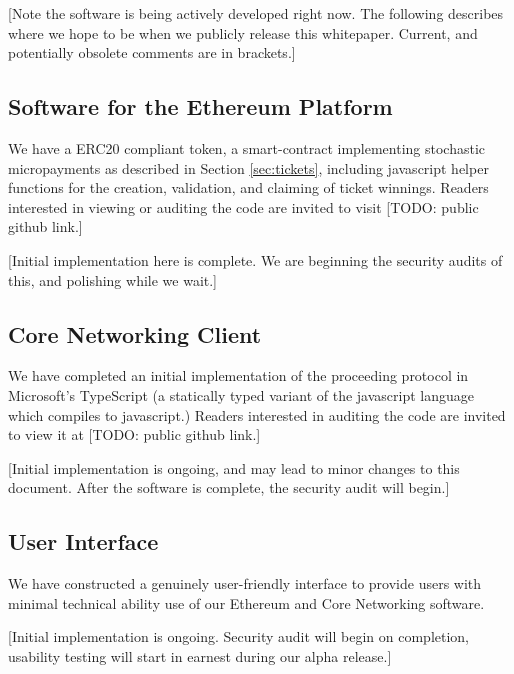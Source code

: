 
[Note the software is being actively developed right now. The
  following describes where we hope to be when we publicly release
  this whitepaper. Current, and potentially obsolete comments are in
  brackets.]

\subsection{Software for the Ethereum Platform}

We have a ERC20 compliant token, a smart-contract implementing
stochastic micropayments as described in Section \ref{sec:tickets},
including javascript helper functions for the creation, validation,
and claiming of ticket winnings. Readers interested in viewing or
auditing the code are invited to visit [TODO: public github link.]

[Initial implementation here is complete. We are beginning the
  security audits of this, and polishing while we wait.]

\subsection{Core Networking Client}

We have completed an initial implementation of the proceeding protocol
in Microsoft's TypeScript (a statically typed variant of the
javascript language which compiles to javascript.) Readers interested
in auditing the code are invited to view it at [TODO: public github link.]

[Initial implementation is ongoing, and may lead to minor changes to
  this document. After the software is complete, the security audit
  will begin.]

\subsection{User Interface}

We have constructed a genuinely user-friendly interface to provide
users with minimal technical ability use of our Ethereum and Core
Networking software.

[Initial implementation is ongoing. Security audit will begin on
  completion, usability testing will start in earnest during our alpha
  release.]

